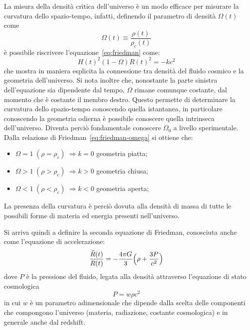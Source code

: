 La misura della densità critica dell'universo è un modo efficace per misurare la curvatura dello spazio-tempo, infatti, definendo il parametro di densità $\Omega(t)$ come
\begin{equation}\label{eq:parametro-densità}
    \Omega (t) \equiv  \frac{\rho (t)}{\rho_c (t)}
\end{equation}
è possibile riscrivere l'equazione~\eqref{eq:friedman} come:
\begin{equation}\label{eq:friedman-omega}
    {H(t)}^2 (1-\Omega){R(t)}^2 = -kc^2
\end{equation}
che mostra in maniera esplicita la connessione tra densità del fluido cosmico e la geometria dell'universo. Si nota inoltre che, nonostante la parte sinistra dell'equazione sia dipendente dal tempo, $\Omega$ rimane comunque costante, dal momento che è costante il membro destro. Questo permette di determinare la curvatura dello spazio-tempo conoscendo quella istantanea, in particolare conoscendo la geometria odierna è possibile conoscere quella intrinseca dell'universo. Diventa perciò fondamentale conoscere $\Omega_0$ a livello sperimentale.
Dalla relazione di Friedman~\eqref{eq:friedman-omega} si ottiene che:
\begin{itemize}
    \item $\Omega = 1 \; (\rho = \rho_c)\; \Rightarrow k = 0$ geometria piatta;
    \item $\Omega > 1 \; (\rho > \rho_c)\; \Rightarrow k > 0$ geometria chiusa;
    \item $\Omega < 1 \; (\rho < \rho_c)\; \Rightarrow k < 0$ geometria aperta;
\end{itemize}
La presenza della curvatura è perciò dovuta alla densità di massa di tutte le possibili forme di materia ed energia presenti nell'universo.

Si arriva quindi a definire la seconda equazione di Friedman, conosciuta anche come l'equazione di accelerazione:
\begin{equation}\label{eq:second-friedman}
    \frac{\ddot{R}(t)}{R(t)} = - \frac{4\pi G}{3} \Bigl( {\rho + \frac{3P}{c^2}} \Bigr)
\end{equation}
dove $P$ è la pressione del fluido, legata alla densità attraverso l'equazione di stato cosmologica
\begin{equation}\label{eq:equazione-stato-cosmologica}
    P = w \rho c^2
\end{equation}
in cui $w$ è un parametro adimensionale che dipende dalla scelta delle componenti che compongono l'universo (materia, radiazione, costante cosmologica) e in generale anche dal redshift.